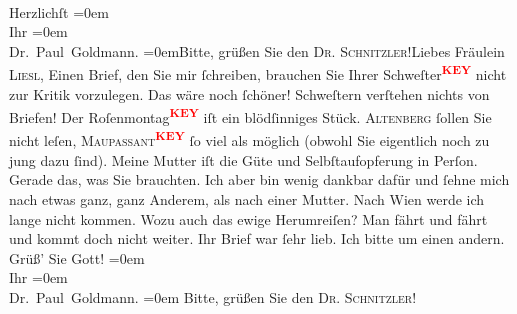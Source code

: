 \begin{ledgroupsized}[t]{13cm}
               {\\[\baselineskip]}Herzlichſt\pend
           \leftskip=0em{}\pstart
           {\\[\baselineskip]}Ihr\pend
           \leftskip=0em{}\pstart
           {\\[\baselineskip]}\spacefill\mbox{Dr. Paul Goldmann.}\pend
           \leftskip=0em{}Bitte, grüßen Sie den \textsc{Dr. Schnitzler}!{\pb}\pstart{}Liebes Fräulein \textsc{Liesl},\pend\pstart
           Einen Brief, den Sie mir ſchreiben, brauchen Sie Ihrer Schweſter\textcolor{red}{\textsuperscript{\textbf{KEY}}} nicht zur Kritik vorzulegen. Das wäre noch
               ſchöner! Schweſtern verſtehen nichts von Briefen!\pend
           \pstart
           Der Roſenmontag\textcolor{red}{\textsuperscript{\textbf{KEY}}} iſt ein blödſinniges Stück. \textsc{Altenberg} ſollen Sie nicht leſen, \textsc{Maupassant\textcolor{red}{\textsuperscript{\textbf{KEY}}}} ſo viel als möglich (obwohl Sie eigentlich noch zu jung dazu ſind).\pend
           \pstart
           Meine Mutter iſt die Güte und Selbſtaufopferung in Perſon. Gerade das, was Sie
               brauchten. Ich aber bin wenig dankbar dafür und ſehne mich nach etwas ganz, ganz
               Anderem, als nach einer Mutter.\pend
           \pstart
           Nach Wien werde ich lange nicht kommen. Wozu auch
               das ewige Herumreiſen? {\pb}Man
               fährt und fährt und kommt doch nicht weiter.\pend
           \pstart
           Ihr Brief war ſehr lieb. Ich bitte um einen andern. {\\[\baselineskip]}Grüß’ Sie
               Gott!\pend
           \leftskip=0em{}\pstart
           {\\[\baselineskip]}Ihr\pend
           \leftskip=0em{}\pstart
           {\\[\baselineskip]}\spacefill\mbox{Dr. Paul Goldmann.}\pend
           \leftskip=0em{}\pstart
           Bitte, grüßen Sie den \textsc{Dr. Schnitzler}!\pend
           
         
         \endnumbering{}\end{ledgroupsized}\begin{anhang}\end{anhang}\newcommand{\dateiname}{L03538}\newcommand{\titel}{Paul Goldmann an Olga XXXX Gussmann/Schnitzler, 28. 12. [XXXX]}\newcommand{\editorInnen}{Martin Anton Müller und Laura Untner}
      